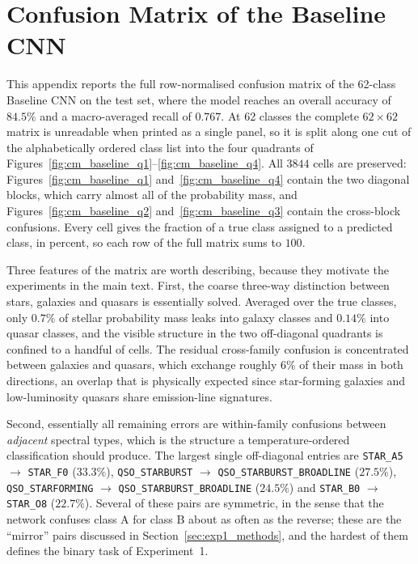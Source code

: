 \appendices
\clearpage
\section{Confusion Matrix of the Baseline CNN}
\label{app:baseline_confusion}

This appendix reports the full row-normalised confusion matrix of the 62-class
Baseline CNN on the test set, where the model reaches an overall accuracy of
$84.5\%$ and a macro-averaged recall of $0.767$. At 62 classes the complete
$62 \times 62$ matrix is unreadable when printed as a single panel, so it is split
along one cut of the alphabetically ordered class list into the four quadrants of
Figures~\ref{fig:cm_baseline_q1}--\ref{fig:cm_baseline_q4}. All $3844$ cells are
preserved: Figures~\ref{fig:cm_baseline_q1} and~\ref{fig:cm_baseline_q4} contain
the two diagonal blocks, which carry almost all of the probability mass, and
Figures~\ref{fig:cm_baseline_q2} and~\ref{fig:cm_baseline_q3} contain the
cross-block confusions. Every cell gives the fraction of a true class assigned to
a predicted class, in percent, so each row of the full matrix sums to $100$.

Three features of the matrix are worth describing, because they motivate the
experiments in the main text. First, the coarse three-way distinction between
stars, galaxies and quasars is essentially solved. Averaged over the true
classes, only $0.7\%$ of stellar probability mass leaks into galaxy classes and
$0.14\%$ into quasar classes, and the visible structure in the two off-diagonal
quadrants is confined to a handful of cells. The residual cross-family confusion
is concentrated between galaxies and quasars, which exchange roughly $6\%$ of
their mass in both directions, an overlap that is physically expected since
star-forming galaxies and low-luminosity quasars share emission-line signatures.

Second, essentially all remaining errors are within-family confusions between
\emph{adjacent} spectral types, which is the structure a temperature-ordered
classification should produce. The largest single off-diagonal entries are
\texttt{STAR\_A5} $\rightarrow$ \texttt{STAR\_F0} ($33.3\%$),
\texttt{QSO\_STARBURST} $\rightarrow$ \texttt{QSO\_STARBURST\_BROADLINE}
($27.5\%$), \texttt{QSO\_STARFORMING} $\rightarrow$
\texttt{QSO\_STARBURST\_BROADLINE} ($24.5\%$) and \texttt{STAR\_B0}
$\rightarrow$ \texttt{STAR\_O8} ($22.7\%$). Several of these pairs are
symmetric, in the sense that the network confuses class A for class B about as
often as the reverse; these are the ``mirror'' pairs discussed in
Section~\ref{sec:exp1_methods}, and the hardest of them defines the binary task
of Experiment~1.

